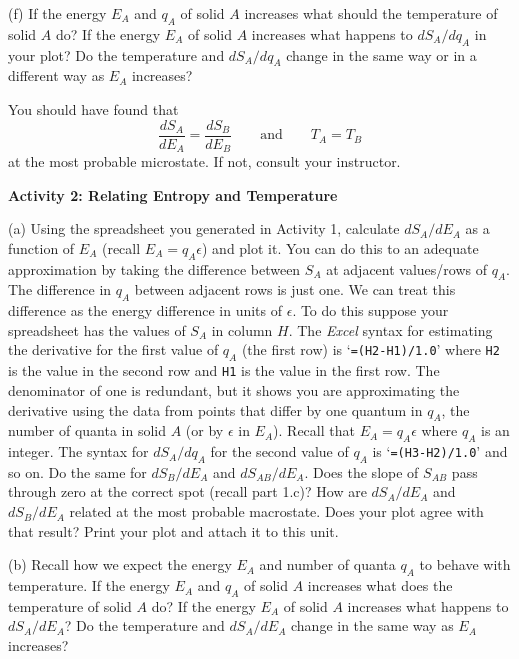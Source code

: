 (f) If the energy $E_A$ and $q_A$ of solid $A$ increases what should the temperature 
of solid $A$ do?
If the energy $E_A$ of solid $A$ increases what happens to $dS_A/dq_A$ in your plot?
Do the temperature and $dS_A/dq_A$ change in the same  way or in a different way 
as $E_A$ increases?
\answerspace{20mm}


You should have found that 
\begin{equation}
\frac{dS_A}{dE_A} = \frac{dS_B}{dE_B} \qquad {\text {and}} \qquad T_A = T_B
\end{equation}
at the most probable microstate.
If not, consult your instructor.

\textbf{Activity 2: Relating Entropy and Temperature}

(a) Using the spreadsheet you generated in Activity 1, calculate $dS_A/dE_A$ as a function
of $E_A$ (recall $E_A = q_A \epsilon$) and plot it. You can do this to an adequate approximation
by  taking the difference between $S_A$ at adjacent values/rows
of $q_A$.
The difference in $q_A$ between adjacent rows is just one.
We can treat this difference as the energy difference in units of $\epsilon$.
To do this suppose your spreadsheet has the values of $S_A$ in column $H$.
The {\it Excel} syntax for estimating the derivative for the first value of
$q_A$ (the first row) is 
`{\tt =(H2-H1)/1.0}' where {\tt H2} is the value in the second row and {\tt H1} is the
value in the first row.
The denominator of one is redundant, but it shows you are approximating the derivative
using the data from points that differ by one quantum in $q_A$, the number of quanta in solid $A$ (or by $\epsilon$ in $E_A$).
Recall that $E_A = q_A\epsilon$ where $q_A$ is an integer.
The syntax for $dS_A/dq_A$ for the second value of $q_A$ is `{\tt =(H3-H2)/1.0}' and so on.
Do the same for $dS_B/dE_A$ and $dS_{AB}/dE_A$.
Does the slope of $S_{AB}$ pass through zero at the correct spot (recall part 1.c)?
How are $dS_A/dE_A$ and $dS_B/dE_A$ related at the most probable macrostate.
Does your plot agree with that result? Print your plot and attach it to this unit.
\answerspace{20mm}


(b) Recall how we expect the energy $E_A$ and number of quanta $q_A$ to behave with temperature.
If the energy $E_A$ and $q_A$ of solid $A$ increases what does the temperature 
of solid $A$ do?
If the energy $E_A$ of solid $A$ increases what happens to $dS_A/dE_A$?
Do the temperature and $dS_A/dE_A$ change in the same  way 
as $E_A$ increases?
\answerspace{20mm}

